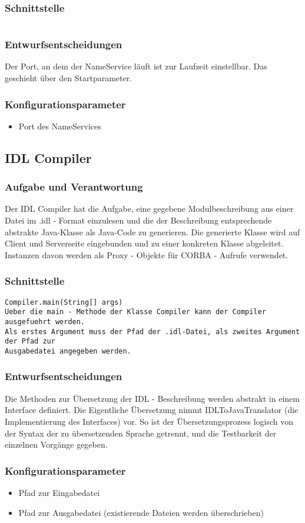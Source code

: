 \documentclass{article}
\begin{document}
\subsubsection{Schnittstelle}
\begin{lstlisting}

\end{lstlisting}

\subsubsection{Entwurfsentscheidungen}
Der Port, an dem der NameService läuft ist zur Laufzeit einstellbar. Das geschieht über
den Startparameter.

\subsubsection{Konfigurationsparameter}
\begin{itemize}
    \item Port des NameServices
\end{itemize}

\subsection{IDL Compiler}
\subsubsection{Aufgabe und Verantwortung}
Der IDL Compiler hat die Aufgabe, eine gegebene Modulbeschreibung aus einer Datei
im .idl - Format einzulesen und die der Beschreibung entsprechende abstrakte Java-Klasse 
als Java-Code zu generieren. Die generierte Klasse wird auf Client und Serverseite eingebunden
und zu einer konkreten Klasse abgeleitet. Instanzen davon werden als Proxy - Objekte
für CORBA - Aufrufe verwendet.


\subsubsection{Schnittstelle}
\begin{lstlisting}
Compiler.main(String[] args)
Ueber die main - Methode der Klasse Compiler kann der Compiler ausgefuehrt werden.
Als erstes Argument muss der Pfad der .idl-Datei, als zweites Argument der Pfad zur 
Ausgabedatei angegeben werden.
\end{lstlisting}

\subsubsection{Entwurfsentscheidungen}
Die Methoden zur Übersetzung der IDL - Beschreibung werden abstrakt in einem Interface 
definiert. Die Eigentliche Übersetzung nimmt IDLToJavaTranslator (die Implementierung des 
Interfaces) vor. So ist der Übersetzungsprozess logisch von der Syntax der zu übersetzenden
Sprache getrennt, und die Testbarkeit der einzelnen Vorgänge gegeben.
\subsubsection{Konfigurationsparameter}

\begin{itemize}
    \item Pfad zur Eingabedatei
    \item Pfad zur Ausgabedatei (existierende Dateien werden überschrieben)    
\end{itemize}
\end{document}
